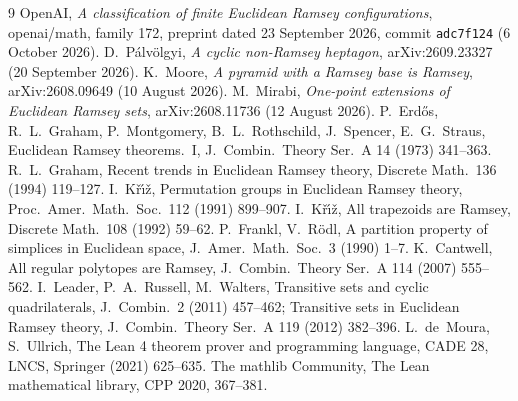 \documentclass[11pt]{article}
\theoremstyle{definition}
\theoremstyle{remark}
\begin{document}
\begin{thebibliography}{9}
 OpenAI, \emph{A classification of finite Euclidean Ramsey configurations}, openai/math, family
172, preprint dated 23 September 2026, commit \texttt{adc7f124} (6 October 2026).
 D.~P\'alv\"olgyi, \emph{A cyclic non-Ramsey heptagon}, arXiv:2609.23327 (20 September 2026).
 K.~Moore, \emph{A pyramid with a Ramsey base is Ramsey}, arXiv:2608.09649 (10 August 2026).
 M.~Mirabi, \emph{One-point extensions of Euclidean Ramsey sets}, arXiv:2608.11736 (12 August 2026).
 P.~Erd\H{o}s, R.~L.~Graham, P.~Montgomery, B.~L.~Rothschild, J.~Spencer, E.~G.~Straus,
Euclidean Ramsey theorems.~I, J.~Combin.\ Theory Ser.~A 14 (1973) 341--363.
 R.~L.~Graham, Recent trends in Euclidean Ramsey theory, Discrete Math.\ 136 (1994) 119--127.
 I.~K\v{r}\'{\i}\v{z}, Permutation groups in Euclidean Ramsey theory, Proc.\ Amer.\ Math.\ Soc.\ 112 (1991) 899--907.
 I.~K\v{r}\'{\i}\v{z}, All trapezoids are Ramsey, Discrete Math.\ 108 (1992) 59--62.
 P.~Frankl, V.~R\"odl, A partition property of simplices in Euclidean space, J.~Amer.\ Math.\ Soc.\ 3 (1990) 1--7.
 K.~Cantwell, All regular polytopes are Ramsey, J.~Combin.\ Theory Ser.~A 114 (2007) 555--562.
 I.~Leader, P.~A.~Russell, M.~Walters, Transitive sets and cyclic quadrilaterals, J.~Combin.\ 2 (2011) 457--462; Transitive sets in Euclidean Ramsey theory, J.~Combin.\ Theory Ser.~A 119 (2012) 382--396.
 L.~de~Moura, S.~Ullrich, The Lean 4 theorem prover and programming language, CADE 28, LNCS, Springer (2021) 625--635.
 The mathlib Community, The Lean mathematical library, CPP 2020, 367--381.
\end{thebibliography}
\end{document}

